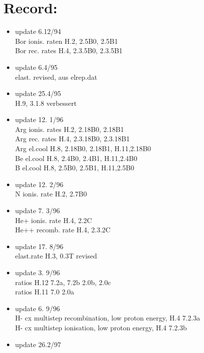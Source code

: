 \documentclass[12pt]{article}
\begin{document}
\section{Record:}
\begin{itemize}
\item update  6.12/94 \\
   Bor ionis. raten H.2, 2.5B0, 2.5B1 \\
                           Bor rec.   rates H.4, 2.3.5B0, 2.3.5B1 \\
 \item update  6.4/95 \\
  elast. revised, aus elrep.dat \\
 \item update  25.4/95 \\
  H.9, 3.1.8 verbessert   \\
 \item update 12. 1/96 \\
   Arg ionis. rates H.2, 2.18B0, 2.18B1   \\
   Arg rec.   rates H.4, 2.3.18B0, 2.3.18B1 \\
   Arg el.cool      H.8, 2.18B0, 2.18B1, H.11,2.18B0\\
   Be  el.cool      H.8, 2.4B0, 2.4B1, H.11,2.4B0\\
   B   el.cool      H.8, 2.5B0, 2.5B1, H.11,2.5B0\\
 \item update 12. 2/96 \\
   N ionis. rate H.2, 2.7B0 \\
 \item update  7. 3/96 \\
   He+ ionis. rate H.4, 2.2C \\
   He++ recomb. rate H.4, 2.3.2C \\
 \item update  17. 8/96 \\
   elast.rate H.3, 0.3T revised
 \item update   3. 9/96 \\
   ratios H.12 7.2a, 7.2b 2.0b, 2.0c\\
   ratios H.11 7.0 2.0a
 \item update   6. 9/96 \\
   H- cx multistep recombination, low proton energy, H.4  7.2.3a\\
   H- cx multistep ionisation, low proton energy, H.4  7.2.3b
 \item update   26.2/97 \\

\end{itemize}
\end{document}
